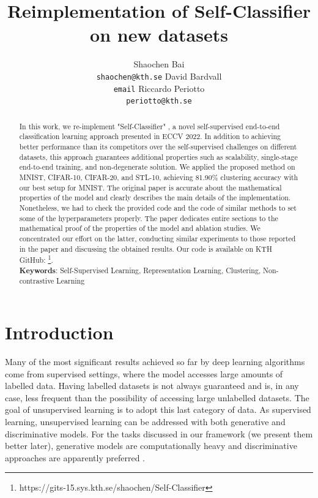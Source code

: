 \documentclass{article}
\title{Reimplementation of Self-Classifier on new datasets
}
\author{
    Shaochen Bai        \\ \texttt{shaochen@kth.se} \And 
    David Bardvall      \\ \texttt{email} \And 
    Riccardo Periotto   \\ \texttt{periotto@kth.se}
}
\begin{document}

\maketitle

\begin{abstract}
In this work, we re-implement  "Self-Classifier" \cite{self_classifier}, a novel self-supervised end-to-end classification learning approach presented in ECCV 2022. In addition to achieving better performance than its competitors over the self-supervised challenges on different datasets, this approach guarantees additional properties such as scalability, single-stage end-to-end training, and non-degenerate solution. 
We applied the proposed method on MNIST, CIFAR-10, CIFAR-20, and STL-10, achieving 81.90\% clustering accuracy with our best setup for MNIST. 
The original paper is accurate about the mathematical properties of the model and clearly describes the main details of the implementation. Nonetheless, we had to check the provided code and the code of similar methods to set some of the hyperparameters properly. The paper dedicates entire sections to the mathematical proof of the properties of the model and ablation studies. We concentrated our effort on the latter, conducting similar experiments to those reported in the paper and discussing the obtained results. Our code is available on KTH GitHub: \footnote{https://gits-15.sys.kth.se/shaochen/Self-Classifier}.  \\

\textbf{Keywords}: Self-Supervised Learning, Representation Learning, Clustering, Non-contrastive Learning
  
\end{abstract}

\section{Introduction}

Many of the most significant results achieved so far by deep learning algorithms come from supervised settings, where the model accesses large amounts of labelled data.
Having labelled datasets is not always guaranteed and is, in any case, less frequent than the possibility of accessing large unlabelled datasets.
The goal of unsupervised learning is to adopt this last category of data. 
As supervised learning, unsupervised learning can be addressed with both generative and discriminative models. For the tasks discussed in our framework (we present them better later), generative models are computationally heavy and discriminative approaches are apparently preferred \cite{byol}. 
\end{document}
